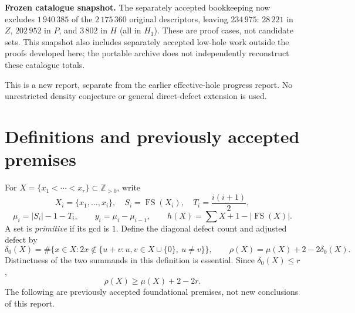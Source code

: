 \documentclass[11pt,a4paper]{article}
\newcommand{\FS}{\operatorname{FS}}
\newcommand{\Z}{\mathbb Z}
\newcommand{\dd}{\delta_0}
\begin{document}
\textbf{Frozen catalogue snapshot.} The separately accepted bookkeeping now excludes $1\,940\,385$ of the $2\,175\,360$ original descriptors, leaving $234\,975$: $28\,221$ in $Z$, $202\,952$ in $P$, and $3\,802$ in $H$ (all in $H_1$). These are proof cases, not candidate sets. This snapshot also includes separately accepted low-hole work outside the proofs developed here; the portable archive does not independently reconstruct these catalogue totals.

This is a new report, separate from the earlier effective-hole progress report. No unrestricted density conjecture or general direct-defect extension is used.

\newpage
\section{Definitions and previously accepted premises}\label{premises}
For $X=\{x_1<\cdots<x_r\}\subset\Z_{>0}$, write
\[
X_i=\{x_1,\ldots,x_i\},\quad S_i=\FS(X_i),\quad T_i=\frac{i(i+1)}2,
\]
\[
\mu_i=|S_i|-1-T_i,\qquad y_i=\mu_i-\mu_{i-1},\qquad
h(X)=\sum X+1-|\FS(X)|.
\]
A set is \emph{primitive} if its gcd is $1$. Define the diagonal defect count and adjusted defect by
\[
\dd(X)=\#\{x\in X:2x\notin\{u+v:u,v\in X\cup\{0\},\ u\ne v\}\},
\qquad \rho(X)=\mu(X)+2-2\dd(X).
\]
Distinctness of the two summands in this definition is essential. Since $\dd(X)\le r$,
\begin{equation}\rho(X)\ge\mu(X)+2-2r.\label{elementary}\end{equation}
The following are previously accepted foundational premises, not new conclusions of this report.
\end{document}
